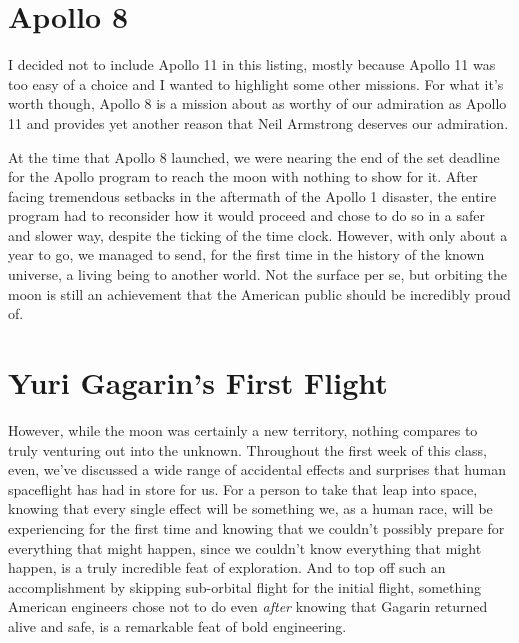 \documentclass{article}
\begin{document}
  \section{Apollo 8}

  I decided not to include Apollo 11 in this listing, mostly because Apollo 11 was
  too easy of a choice and I wanted to highlight some other missions. For what
  it's worth though, Apollo 8 is a mission about as worthy of our admiration as
  Apollo 11 and provides yet another reason that Neil Armstrong deserves our
  admiration.

  At the time that Apollo 8 launched, we were nearing the end of the set deadline
  for the Apollo program to reach the moon with nothing to show for it. After
  facing tremendous setbacks in the aftermath of the Apollo 1 disaster, the entire
  program had to reconsider how it would proceed and chose to do so in a safer and
  slower way, despite the ticking of the time clock. However, with only about a
  year to go, we managed to send, for the first time in the history of the known
  universe, a living being to another world. Not the surface per se, but orbiting
  the moon is still an achievement that the American public should be incredibly
  proud of.


  \section{Yuri Gagarin's First Flight}

  However, while the moon was certainly a new territory, nothing compares to truly
  venturing out into the unknown. Throughout the first week of this class, even,
  we've discussed a wide range of accidental effects and surprises that human
  spaceflight has had in store for us. For a person to take that leap into space,
  knowing that every single effect will be something we, as a human race, will be
  experiencing for the first time and knowing that we couldn't possibly prepare
  for everything that might happen, since we couldn't know everything that might
  happen, is a truly incredible feat of exploration. And to top off such an
  accomplishment by skipping sub-orbital flight for the initial flight, something
  American engineers chose not to do even \textit{after} knowing that Gagarin returned
  alive and safe, is a remarkable feat of bold engineering.

\end{document}
